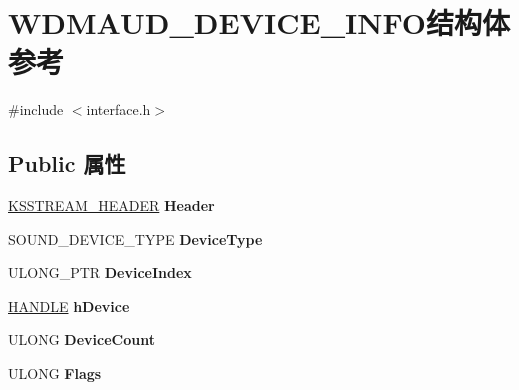 \hypertarget{struct_w_d_m_a_u_d___d_e_v_i_c_e___i_n_f_o}{}\section{W\+D\+M\+A\+U\+D\+\_\+\+D\+E\+V\+I\+C\+E\+\_\+\+I\+N\+F\+O结构体 参考}
\label{struct_w_d_m_a_u_d___d_e_v_i_c_e___i_n_f_o}


{\ttfamily \#include $<$interface.\+h$>$}

\subsection*{Public 属性}
\begin{DoxyCompactItemize}
\item 
\mbox{\label{struct_w_d_m_a_u_d___d_e_v_i_c_e___i_n_f_o_aa7301a844560b7f9cbbd78c30ca08895}} 
\hyperlink{struct_k_s_s_t_r_e_a_m___h_e_a_d_e_r}{K\+S\+S\+T\+R\+E\+A\+M\+\_\+\+H\+E\+A\+D\+ER} {\bfseries Header}
\item 
\mbox{\label{struct_w_d_m_a_u_d___d_e_v_i_c_e___i_n_f_o_a0b52630f2c6c1339634d04a0d2190850}} 
S\+O\+U\+N\+D\+\_\+\+D\+E\+V\+I\+C\+E\+\_\+\+T\+Y\+PE {\bfseries Device\+Type}
\item 
\mbox{\label{struct_w_d_m_a_u_d___d_e_v_i_c_e___i_n_f_o_a8145909ec8df897d6ac1d2c9b578fbff}} 
U\+L\+O\+N\+G\+\_\+\+P\+TR {\bfseries Device\+Index}
\item 
\mbox{\label{struct_w_d_m_a_u_d___d_e_v_i_c_e___i_n_f_o_aa22f6e98fc9aa1c567e848997da43343}} 
\hyperlink{interfacevoid}{H\+A\+N\+D\+LE} {\bfseries h\+Device}
\item 
\mbox{\label{struct_w_d_m_a_u_d___d_e_v_i_c_e___i_n_f_o_a108ef8a4945f20fd85ab61c5b091626f}} 
U\+L\+O\+NG {\bfseries Device\+Count}
\item 
\mbox{\label{struct_w_d_m_a_u_d___d_e_v_i_c_e___i_n_f_o_aa29acf92909cb5e3f55e3da526d4dfcd}} 
U\+L\+O\+NG {\bfseries Flags}

\end{DoxyCompactItemize}
